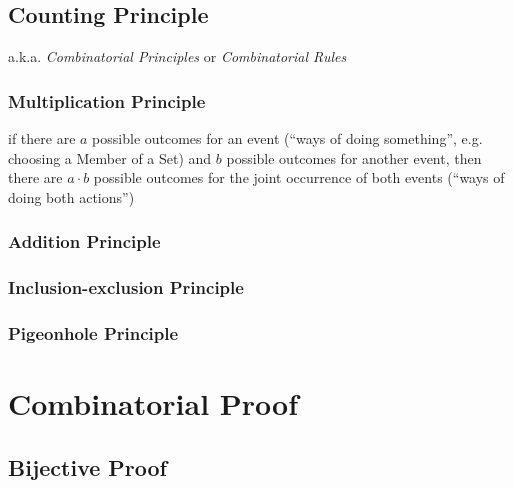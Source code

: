 \subsection{Counting Principle}\label{sec:counting_principle}

a.k.a. \emph{Combinatorial Principles} or \emph{Combinatorial Rules}



\subsubsection{Multiplication Principle}\label{sec:multiplication_principle}

if there are $a$ possible outcomes for an event (``ways of doing something'',
e.g. choosing a Member of a Set) and $b$ possible outcomes for another event,
then there are $a \cdot b$ possible outcomes for the joint occurrence of both
events (``ways of doing both actions'')



\subsubsection{Addition Principle}\label{sec:addition_principle}

\subsubsection{Inclusion-exclusion Principle}\label{sec:inclusion_exclusion}

\subsubsection{Pigeonhole Principle}\label{sec:pigeonhole_principle}



\section{Combinatorial Proof}\label{sec:combinatorial_proof}

\subsection{Bijective Proof}\label{sec:bijective_proof}

